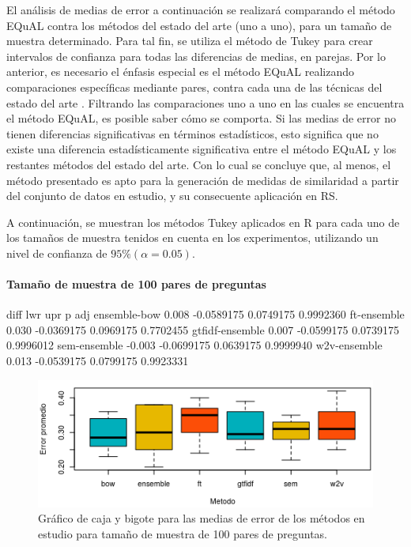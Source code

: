 \bigskip El análisis de medias de error a continuación se realizará comparando el método EQuAL contra los métodos del estado del arte (uno a uno), para un tamaño de muestra determinado. Para tal fin, se utiliza el método de Tukey para crear intervalos de confianza para todas las diferencias de medias, en parejas. Por lo anterior, es necesario el énfasis especial es el método EQuAL realizando comparaciones específicas mediante pares, contra cada una de las técnicas del estado del arte \citep{abdi2010tukey}. Filtrando las comparaciones uno a uno en las cuales se encuentra el método EQuAL, es posible saber cómo se comporta. Si las medias de error no tienen diferencias significativas en términos estadísticos, esto significa que no existe una diferencia estadísticamente significativa entre el método EQuAL y los restantes métodos del estado del arte. Con lo cual se concluye que, al menos, el método presentado es apto para la generación de medidas de similaridad a partir del conjunto de datos en estudio, y su consecuente aplicación en RS.

\bigskip A continuación, se muestran los métodos Tukey aplicados en R para cada uno de los tamaños de muestra tenidos en cuenta en los experimentos, utilizando un nivel de confianza de \(95\% (\alpha=0.05)\).

\paragraph{Tamaño de muestra de 100 pares de preguntas}
\begin{rc}
                 diff        lwr       upr     p adj
ensemble-bow     0.008 -0.0589175 0.0749175 0.9992360
ft-ensemble      0.030 -0.0369175 0.0969175 0.7702455
gtfidf-ensemble  0.007 -0.0599175 0.0739175 0.9996012
sem-ensemble    -0.003 -0.0699175 0.0639175 0.9999940
w2v-ensemble     0.013 -0.0539175 0.0799175 0.9923331
\end{rc}

\begin{figure}[!]
	\centering
	\includegraphics[width=0.7\linewidth]{10_resultados/imagenes/anova_100}
	\caption{Gráfico de caja y bigote para las medias de error de los métodos en estudio para tamaño de muestra de 100 pares de preguntas.}
	\label{fig:anova100}
\end{figure}

